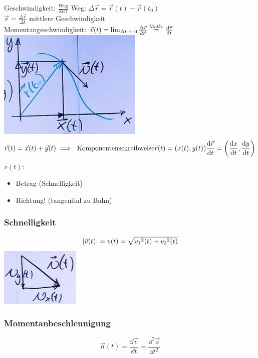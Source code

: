 Geschwindigkeit: $\frac{\text{Weg}}{\text{Zeit}}$
Weg: $\Delta \vec{r} = \vec{r}(t) - \vec{r}(t_0)$ \\
$\vec{v} = \frac{\Delta \vec{r}}{\Delta t}$ mittlere Geschwindigkeit \\
Momentangeschwindigkeit: $\vec{v}(t) = \lim_{\Delta t \rightarrow 0} \frac{\Delta \vec{r}}{\Delta t} \overset{\text{\scriptsize{Math.}}}{=} \frac{\dd \vec{r}}{\dd t}$ \\
\includegraphics{Bild14}
\[
	\vec{r}(t) = \vec{x}(t) + \vec{y}(t) \\
	\implies \text{ Komponentenschreibweise} \\
	\vec{r}(t) = ( x(t) , y(t) ) \\
	\frac{\dd \vec{r}}{\dd t} = \left( \frac{\dd x}{\dd t} , \frac{\dd y}{\dd t} \right)
\]
$v(t)$:
\begin{itemize}
	\item Betrag (Schnelligkeit)
	\item Richtung! (tangential zu Bahn)
\end{itemize}
\subsubsection{Schnelligkeit}
\[ \abs{\vec{v}(t)} = v(t) = \sqrt{{v_1}^2(t) + {v_2}^2(t)} \]
\includegraphics{Bild15}

\subsubsection{Momentanbeschleunigung}
\[ \vec{a}(t) = \frac{\dd \vec{v}}{\dd t} = \frac{\dd^2 \vec{s}}{\dd t^2} \]

